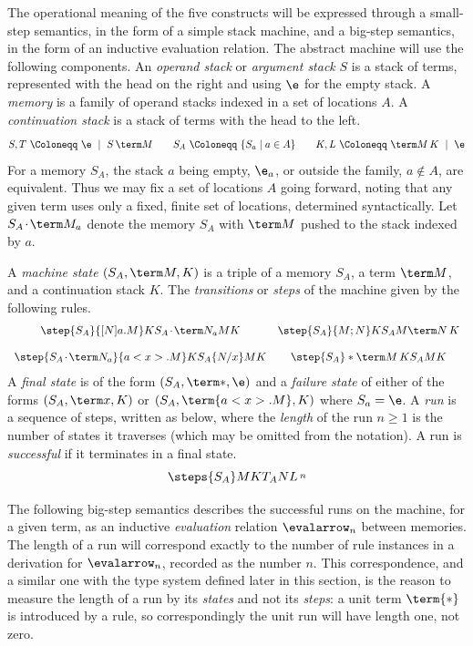 \documentclass[a4paper,UKenglish,cleveref, autoref, thm-restate]{lipics-v2021}
\newcommand\msep{\kern1pt{\cdot}\kern1pt}
\begin{document}
The operational meaning of the five constructs will be expressed through a small-step semantics, in the form of a simple stack machine, and a big-step semantics, in the form of an inductive evaluation relation. The abstract machine will use the following components. An \emph{operand stack} or \emph{argument stack} $S$ is a stack of terms, represented with the head on the right and using $\e$ for the empty stack. A \emph{memory} is a family of operand stacks indexed in a set of locations $A$. A \emph{continuation stack} is a stack of terms with the head to the left.
\[
	S,T~\Coloneqq~\e~\mid~S\,\term M
\qquad
	S_A~\Coloneqq~\{S_a\mid a\in A\}
\qquad
	K,L~\Coloneqq~\term M\,K~\mid~\e
\]
For a memory $S_A$, the stack $a$ being empty, $\e_a$, or outside the family, $a\notin A$, are equivalent. Thus we may fix a set of locations $A$ going forward, noting that any given term uses only a fixed, finite set of locations, determined syntactically. Let $S_A\msep\term M_a$ denote the memory $S_A$ with $\term M$ pushed to the stack indexed by $a$.

\begin{definition}
A \emph{machine state} $(S_A,\term M,K)$ is a triple of a memory $S_A$, a term $\term M$, and a continuation stack $K$. The \emph{transitions} or \emph{steps} of the machine given by the following rules.
\[
\begin{array}{cc}
	\step {S_A}{[N]a.M}K  {S_A\msep\term N_a} M K		
&   \step {S_A}{M;N}K  {S_A}M{\term N\,K}
\\ \\
	\step {S_A\msep\term N_a}{a<x>.M}K {S_A}{\{N/x\}M}K	
&	\step {S_A}*{\term M\,K} {S_A}MK
\end{array}
\]
A \emph{final state} is of the form $(S_A,\term *,\e)$ and a \emph{failure state} of either of the forms $(S_A,\term x,K)$ or $(S_A,\term{a<x>.M},K)$ where $S_a=\e$. A \emph{run} is a sequence of steps, written as below, where the \emph{length} of the run $n\geq 1$ is the number of states it traverses (which may be omitted from the notation). A run is \emph{successful} if it terminates in a final state.
\[
\steps 
  {S_A} M K 
  {T_A} N L
\,\raisebox{2pt}{$\scriptstyle n$}
\]
\end{definition}

The following big-step semantics describes the successful runs on the machine, for a given term, as an inductive \emph{evaluation} relation $\evalarrow_n$ between memories. The length of a run will correspond exactly to the number of rule instances in a derivation for $\evalarrow_n$, recorded as the number $n$. This correspondence, and a similar one with the type system defined later in this section, is the reason to measure the length of a run by its \emph{states} and not its \emph{steps}: a unit term $\term{*}$ is introduced by a rule, so correspondingly the unit run will have length one, not zero.
\end{document}

